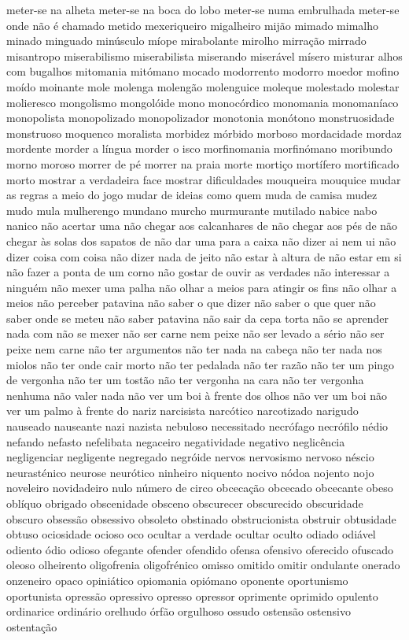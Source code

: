 meter-se na alheta meter-se na boca do lobo meter-se numa embrulhada meter-se onde n\~ao \'{e} chamado metido mexeriqueiro migalheiro mij\~ao mimado mimalho minado minguado min\'{u}sculo m\'{i}ope mirabolante mirolho mirra\c{c}\~ao mirrado misantropo miserabilismo miserabilista miserando miser\'{a}vel m\'{i}sero misturar alhos com bugalhos mitomania mit\'{o}mano mocado modorrento modorro moedor mofino mo\'{i}do moinante mole molenga moleng\~ao molenguice moleque molestado molestar molieresco mongolismo mongol\'{o}ide mono monoc\'{o}rdico monomania monoman\'{i}aco monopolista monopolizado monopolizador monotonia mon\'{o}tono monstruosidade monstruoso moquenco moralista morbidez m\'{o}rbido morboso mordacidade mordaz mordente morder a l\'{i}ngua morder o isco morfinomania morfin\'{o}mano moribundo morno moroso morrer de p\'{e} morrer na praia morte morti\c{c}o mort\'{i}fero mortificado morto mostrar a verdadeira face mostrar dificuldades mouqueira mouquice mudar as regras a meio do jogo mudar de ideias como quem muda de camisa mudez mudo mula mulherengo mundano murcho murmurante mutilado nabice nabo nanico n\~ao acertar uma n\~ao chegar aos calcanhares de n\~ao chegar aos p\'{e}s de n\~ao chegar \`{a}s solas dos sapatos de n\~ao dar uma para a caixa n\~ao dizer ai nem ui n\~ao dizer coisa com coisa n\~ao dizer nada de jeito n\~ao estar \`{a} altura de n\~ao estar em si n\~ao fazer a ponta de um corno n\~ao gostar de ouvir as verdades n\~ao interessar a ningu\'{e}m n\~ao mexer uma palha n\~ao olhar a meios para atingir os fins n\~ao olhar a meios n\~ao perceber patavina n\~ao saber o que dizer n\~ao saber o que quer n\~ao saber onde se meteu n\~ao saber patavina n\~ao sair da cepa torta n\~ao se aprender nada com n\~ao se mexer n\~ao ser carne nem peixe n\~ao ser levado a s\'{e}rio n\~ao ser peixe nem carne n\~ao ter argumentos n\~ao ter nada na cabe\c{c}a n\~ao ter nada nos miolos n\~ao ter onde cair morto n\~ao ter pedalada n\~ao ter raz\~ao n\~ao ter um pingo de vergonha n\~ao ter um tost\~ao n\~ao ter vergonha na cara n\~ao ter vergonha nenhuma n\~ao valer nada n\~ao ver um boi \`{a} frente dos olhos n\~ao ver um boi n\~ao ver um palmo \`{a} frente do nariz narcisista narc\'{o}tico narcotizado narigudo nauseado nauseante nazi nazista nebuloso necessitado necr\'{o}fago necr\'{o}filo n\'{e}dio nefando nefasto nefelibata negaceiro negatividade negativo neglic\^{e}ncia negligenciar negligente negregado negr\'{o}ide nervos nervosismo nervoso n\'{e}scio neurast\'{e}nico neurose neur\'{o}tico ninheiro niquento nocivo n\'{o}doa nojento nojo noveleiro novidadeiro nulo n\'{u}mero de circo obceca\c{c}\~ao obcecado obcecante obeso obl\'{i}quo obrigado obscenidade obsceno obscurecer obscurecido obscuridade obscuro obsess\~ao obsessivo obsoleto obstinado obstrucionista obstruir obtusidade obtuso ociosidade ocioso oco ocultar a verdade ocultar oculto odiado odi\'{a}vel odiento \'{o}dio odioso ofegante ofender ofendido ofensa ofensivo oferecido ofuscado oleoso olheirento oligofrenia oligofr\'{e}nico omisso omitido omitir ondulante onerado onzeneiro opaco opini\'{a}tico opiomania opi\'{o}mano oponente oportunismo oportunista opress\~ao opressivo opresso opressor oprimente oprimido opulento ordinarice ordin\'{a}rio orelhudo \'{o}rf\~ao orgulhoso ossudo ostens\~ao ostensivo ostenta\c{c}\~ao 